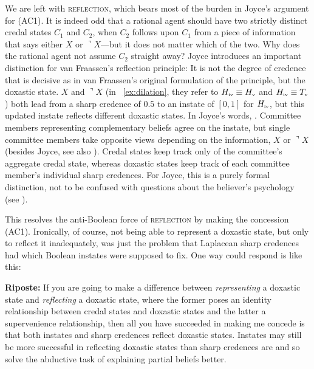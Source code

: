 \documentclass[phd,12pt,oneside]{ubcthesis}
\begin{document}
We are left with \textsc{reflection}, which bears most of the burden
in Joyce's argument for (AC1). It is indeed odd that a rational agent
should have two strictly distinct credal states $C_{1}$ and $C_{2}$,
when $C_{2}$ follows upon $C_{1}$ from a piece of information that
says either $X$ or $\urcorner{}X$---but it does not matter which of
the two. Why does the rational agent not assume $C_{2}$ straight away?
Joyce introduces an important distinction for van Fraassen's
reflection principle: It is not the degree of credence that is
decisive as in van Fraassen's original formulation of the principle,
but the doxastic state. $X$ and $\urcorner{}X$ (in
{\xample}~\ref{ex:dilation}, they refer to
$H_{\mbox{\tiny{iv}}}\equiv{}H_{\mbox{\tiny{v}}}$ and
$H_{\mbox{\tiny{iv}}}\equiv{}T_{\mbox{\tiny{v}}}$) both lead from a
sharp credence of $0.5$ to an instate of $[0,1]$ for
$H_{\mbox{\tiny{iv}}}$, but this updated instate reflects different
doxastic states. In Joyce's words, 
. Committee members representing complementary
beliefs agree on the instate, but single committee members take
opposite views depending on the information, $X$ or $\urcorner{}X$
(besides Joyce, see also ). Credal states keep
track only of the committee's aggregate credal state, whereas doxastic
states keep track of each committee member's individual sharp
credences. For Joyce, this is a purely formal distinction, not to be
confused with questions about the believer's psychology (see
).

This resolves the anti-Boolean force of \textsc{reflection} by making
the concession (AC1). Ironically, of course, not being able to
represent a doxastic state, but only to reflect it inadequately, was
just the problem that Laplacean sharp credences had which Boolean
instates were supposed to fix. One way {\augustin} could respond is
like this:

\begin{quotex}
  \textbf{Riposte:} If you are going to make a difference between
  \emph{representing} a doxastic state and \emph{reflecting} a
  doxastic state, where the former poses an identity relationship
  between credal states and doxastic states and the latter a
  supervenience relationship, then all you have succeeded in making me
  concede is that both instates and sharp credences reflect doxastic
  states. Instates may still be more successful in reflecting doxastic
  states than sharp credences are and so solve the abductive task of
  explaining partial beliefs better.
\end{quotex}
\end{document}
